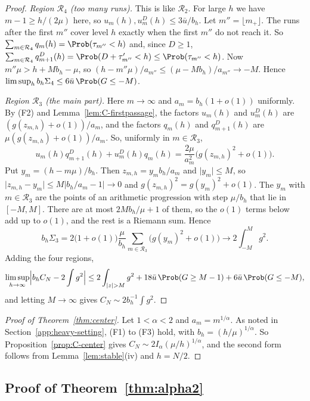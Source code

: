 \begin{proof}
\emph{Region $\mathcal R_4$ (too many runs).} This is like $\mathcal R_2$. For large $h$
we have $m-1\ge h/(2\mu)$ here, so $u_m(h),u^D_m(h)\le3\bar u/b_h$. Let
$m''=\lfloor m_+\rfloor$. The runs after the first $m''$ cover level $h$ exactly when
the first $m''$ do not reach it. So $\sum_{m\in\mathcal R_4}q_m(h)=\Prob(\tau_{m''}<h)$
and, since $D\ge1$,
$\sum_{m\in\mathcal R_4}q^D_{m+1}(h)=\Prob(D+\tau'_{m''}<h)\le\Prob(\tau_{m''}<h)$. Now
$m''\mu>h+Mb_h-\mu$, so $(h-m''\mu)/a_{m''}\le(\mu-Mb_h)/a_{m''}\to-M$. Hence
$\limsup_hb_h\Sigma_4\le6\bar u\,\Prob(G\le-M)$.

\emph{Region $\mathcal R_3$ (the main part).} Here $m\to\infty$ and
$a_m=b_h(1+o(1))$ uniformly. By (F2) and Lemma~\ref{lem:C-firstpassage}, the factors
$u_m(h)$ and $u^D_m(h)$ are $(g(z_{m,h})+o(1))/a_m$, and the factors $q_m(h)$ and
$q^D_{m+1}(h)$ are $\mu(g(z_{m,h})+o(1))/a_m$. So, uniformly in $m\in\mathcal R_3$,
\[
u_m(h)q^D_{m+1}(h)+u^D_m(h)q_m(h)=\frac{2\mu}{a_m^2}\bigl(g(z_{m,h})^2+o(1)\bigr).
\]
Put $y_m=(h-m\mu)/b_h$. Then $z_{m,h}=y_mb_h/a_m$ and $\lvert y_m\rvert\le M$, so
$\lvert z_{m,h}-y_m\rvert\le M\lvert b_h/a_m-1\rvert\to0$ and
$g(z_{m,h})^2=g(y_m)^2+o(1)$. The $y_m$ with $m\in\mathcal R_3$ are the points of an
arithmetic progression with step $\mu/b_h$ that lie in $[-M,M]$. There are at most
$2Mb_h/\mu+1$ of them, so the $o(1)$ terms below add up to $o(1)$, and the rest is a
Riemann sum. Hence
\[
b_h\Sigma_3=2\bigl(1+o(1)\bigr)\frac\mu{b_h}
\sum_{m\in\mathcal R_3}\bigl(g(y_m)^2+o(1)\bigr)\to2\int_{-M}^Mg^2 .
\]
Adding the four regions,
\[
\limsup_{h\to\infty}\Bigl\lvert b_hC_N-2\int g^2\Bigr\rvert
\le2\int_{\lvert z\rvert>M}g^2+18\bar u\,\Prob(G\ge M-1)+6\bar u\,\Prob(G\le-M),
\]
and letting $M\to\infty$ gives $C_N\sim2b_h^{-1}\int g^2$.
\end{proof}

\begin{proof}[Proof of Theorem~\ref{thm:center}]
Let $1<\alpha<2$ and $a_m=m^{1/\alpha}$. As noted in
Section~\ref{app:heavy-setting}, (F1) to (F3) hold, with $b_h=(h/\mu)^{1/\alpha}$. So
Proposition~\ref{prop:C-center} gives $C_N\sim2I_\alpha(\mu/h)^{1/\alpha}$, and the
second form follows from Lemma~\ref{lem:stable}(iv) and $h=N/2$.
\end{proof}

\subsection{Proof of Theorem~\texorpdfstring{\ref{thm:alpha2}}{4.7}}\label{app:heavy-alpha2}

